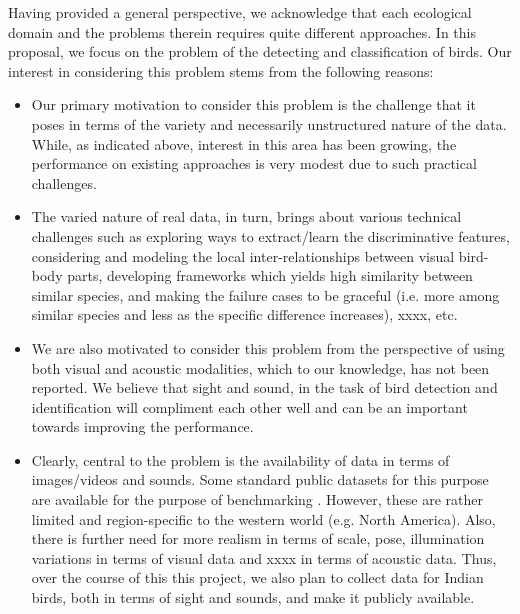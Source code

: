 \documentclass{article}
\begin{document}
Having provided a general perspective, we acknowledge that each ecological domain and the problems therein requires quite different approaches. In this proposal, we focus on the problem of the detecting and classification of birds. Our interest in considering this problem stems from the following reasons: 
\begin{itemize}
\item Our primary motivation to consider this problem is the challenge that it poses in terms of the variety and necessarily unstructured nature of the data. While, as indicated above, interest in this area has been growing, the performance on existing approaches is very modest due to such practical challenges. 
\item The varied nature of real data, in turn, brings about various technical challenges such as exploring ways to extract/learn the discriminative features, considering and modeling the local inter-relationships between visual bird-body parts, developing frameworks which yields high similarity between similar species, and making the failure cases to be graceful (i.e. more among similar species and less as the specific difference increases), xxxx, etc. 
\item We are also motivated to consider this problem from the perspective of using both visual and acoustic modalities, which to our knowledge, has not been reported. We believe that sight and sound, in the task of bird detection and identification will compliment each other well and can be an important towards improving the performance. 
\item Clearly, central to the problem is the availability of data in terms of images/videos and sounds. Some standard public datasets for this purpose are available for the purpose of benchmarking \cite{}. However, these are rather limited and region-specific to the western world (e.g. North America). Also, there is further need for more realism in terms of scale, pose, illumination variations in terms of visual data and xxxx in terms of acoustic data. Thus, over the course of this this project, we also plan to collect data for Indian birds, both in terms of sight and sounds, and make it publicly available.
\end{itemize}
 
\end{document}
